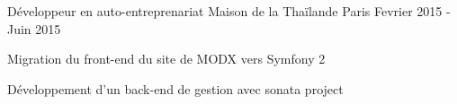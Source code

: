 \begin{cventries}
\cventry
{Développeur en auto-entreprenariat}
{Maison de la Thaïlande}
{Paris}
{Fevrier 2015 - Juin 2015}
{
	\begin{cvitems}
	\item{Migration du front-end du site de MODX vers Symfony 2}
	\item{Développement d'un back-end de gestion avec sonata project}
	\end{cvitems}
}


\end{cventries}